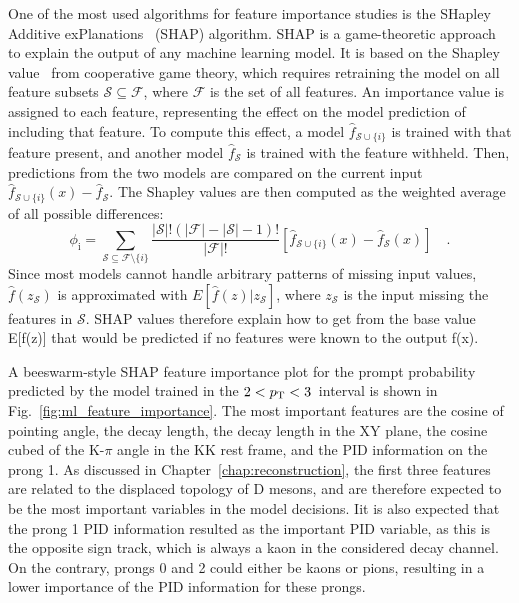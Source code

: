 One of the most used algorithms for feature importance studies is the SHapley Additive exPlanations~\cite{lundberg2017unified} (SHAP) algorithm. SHAP is a game-theoretic approach to explain the output of any machine learning model. It is based on the Shapley value~\cite{lipovetsky2001analysis} from cooperative game theory, which requires retraining the model on all feature subsets $\mathcal{S}\subseteq \mathcal{F}$, where $\mathcal{F}$ is the set of all features. An importance value is assigned to each feature, representing the effect on the model prediction of including that feature. To compute this effect, a model $\widehat{f}_{\mathcal{S}\cup\{i\}}$ is trained with that feature present, and another model $\widehat{f}_\mathcal{S}$ is trained with the feature withheld. Then, predictions from the two
models are compared on the current input $\widehat{f}_{\mathcal{S}\cup\{i\}} (x) - \widehat{f}_\mathcal{S}$. The Shapley values are then computed as the weighted average of all possible differences:
\begin{equation*}
    \phi_\mathrm{i} = \sum_{\mathcal{S}\subseteq \mathcal{F}\setminus\{i\}} \frac{|\mathcal{S}|!(|\mathcal{F}|-|\mathcal{S}|-1)!}{|\mathcal{F}|!} \left[\widehat{f}_{\mathcal{S}\cup\{i\}}(x) - \widehat{f}_\mathcal{S}(x)\right]\quad .
\end{equation*}
Since most models cannot handle arbitrary patterns of missing input values, $\widehat{f} (z_\mathcal{S})$ is approximated with $E[\widehat{f}(z) | z_\mathcal{S}]$, where $z_\mathcal{S}$ is the input missing the features in $\mathcal{S}$. SHAP values therefore explain how to get from the base value E[f(z)] that would be predicted if no features were known to the output f(x).

A beeswarm-style SHAP feature importance plot for the prompt \ds probability predicted by the model trained in the $2<p_\mathrm{T}<3$~\gevc interval is shown in Fig.~\ref{fig:ml_feature_importance}. The most important features are the cosine of pointing angle, the decay length, the decay length in the XY plane, the cosine cubed of the K-$\pi$ angle in the KK rest frame, and the PID information on the prong 1. As discussed in Chapter~\ref{chap:reconstruction}, the first three features are related to the displaced topology of D mesons, and are therefore expected to be the most important variables in the model decisions. Iit is also expected that the prong 1 PID information resulted as the important PID variable, as this is the opposite sign track, which is always a kaon in the considered decay channel. On the contrary, prongs 0 and 2 could either be kaons or pions, resulting in a lower importance of the PID information for these prongs. 

